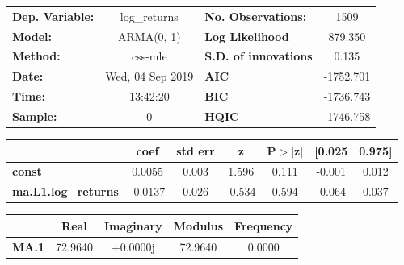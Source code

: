 \begin{center}
\begin{tabular}{lclc}
\toprule
\textbf{Dep. Variable:}     &        log\_returns       & \textbf{  No. Observations:  } &            1509            \\
\textbf{Model:}             &         ARMA(0, 1)        & \textbf{  Log Likelihood     } &          879.350           \\
\textbf{Method:}            &          css-mle          & \textbf{  S.D. of innovations} &           0.135            \\
\textbf{Date:}              &      Wed, 04 Sep 2019     & \textbf{  AIC                } &         -1752.701          \\
\textbf{Time:}              &          13:42:20         & \textbf{  BIC                } &         -1736.743          \\
\textbf{Sample:}            &             0             & \textbf{  HQIC               } &         -1746.758          \\
\bottomrule
\end{tabular}
\begin{tabular}{lcccccc}
                            & \textbf{coef} & \textbf{std err} & \textbf{z} & \textbf{P$> |$z$|$} & \textbf{[0.025} & \textbf{0.975]}  \\
\midrule
\textbf{const}              &       0.0055  &        0.003     &     1.596  &         0.111        &       -0.001    &        0.012     \\
\textbf{ma.L1.log\_returns} &      -0.0137  &        0.026     &    -0.534  &         0.594        &       -0.064    &        0.037     \\
\bottomrule
\end{tabular}
\begin{tabular}{lcccc}
              & \textbf{            Real} & \textbf{         Imaginary} & \textbf{         Modulus} & \textbf{        Frequency}  \\
\midrule
\textbf{MA.1} &               72.9640     &                +0.0000j     &               72.9640     &                0.0000       \\
\bottomrule
\end{tabular}
\end{center}
